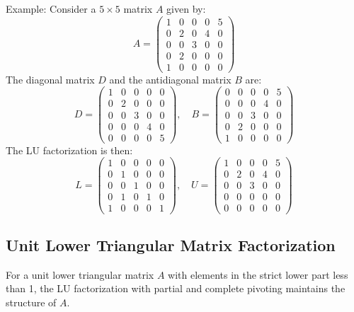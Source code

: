 \documentclass{article}
\begin{document}
Example:
Consider a \( 5 \times 5 \) matrix \( A \) given by:
\[ A = \begin{pmatrix} 1 & 0 & 0 & 0 & 5 \\ 0 & 2 & 0 & 4 & 0 \\ 0 & 0 & 3 & 0 & 0 \\ 0 & 2 & 0 & 0 & 0 \\ 1 & 0 & 0 & 0 & 0 \end{pmatrix} \]
The diagonal matrix \( D \) and the antidiagonal matrix \( B \) are:
\[ D = \begin{pmatrix} 1 & 0 & 0 & 0 & 0 \\ 0 & 2 & 0 & 0 & 0 \\ 0 & 0 & 3 & 0 & 0 \\ 0 & 0 & 0 & 4 & 0 \\ 0 & 0 & 0 & 0 & 5 \end{pmatrix}, \quad B = \begin{pmatrix} 0 & 0 & 0 & 0 & 5 \\ 0 & 0 & 0 & 4 & 0 \\ 0 & 0 & 3 & 0 & 0 \\ 0 & 2 & 0 & 0 & 0 \\ 1 & 0 & 0 & 0 & 0 \end{pmatrix} \]
The LU factorization is then:
\[ L = \begin{pmatrix} 1 & 0 & 0 & 0 & 0 \\ 0 & 1 & 0 & 0 & 0 \\ 0 & 0 & 1 & 0 & 0 \\ 0 & 1 & 0 & 1 & 0 \\ 1 & 0 & 0 & 0 & 1 \end{pmatrix}, \quad U = \begin{pmatrix} 1 & 0 & 0 & 0 & 5 \\ 0 & 2 & 0 & 4 & 0 \\ 0 & 0 & 3 & 0 & 0 \\ 0 & 0 & 0 & 0 & 0 \\ 0 & 0 & 0 & 0 & 0 \end{pmatrix} \]

\subsection{Unit Lower Triangular Matrix Factorization}
For a unit lower triangular matrix \( A \) with elements in the strict lower part less than 1, the LU factorization with partial and complete pivoting maintains the structure of \( A \).
\end{document}

